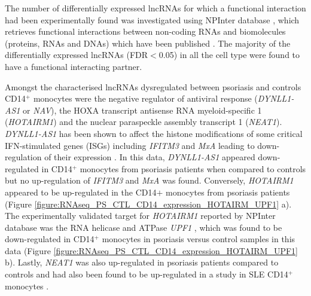 The number of differentially expressed lncRNAs for which a functional interaction had been experimentally found was investigated using NPInter database , which retrieves functional interactions between non-coding RNAs and biomolecules (proteins, RNAs and DNAs) which have been published \parencite{Hao2016}. The majority of the differentially expressed lncRNAs (FDR$<$0.05) in all the cell type were found to have a functional interacting partner.



Amongst the characterised lncRNAs dysregulated between psoriasis and controls CD14$^+$ monocytes were the negative regulator of antiviral response (\textit{DYNLL1-AS1} or \textit{NAV}), the HOXA transcript antisense RNA myeloid-specific 1 (\textit{HOTAIRM1}) and the nuclear paraspeckle assembly transcript 1 (\textit{NEAT1}). \textit{DYNLL1-AS1} has been shown to affect the histone modifications of some critical IFN-stimulated genes (ISGs) including \textit{IFITM3} and \textit{MxA} leading to down-regulation of their expression \parencite{Ouyang2014}. In this data, \textit{DYNLL1-AS1} appeared down-regulated in CD14$^+$ monocytes from psoriasis patients when compared to controls but no up-regulation of \textit{IFITM3} and \textit{MxA} was found. Conversely, \textit{HOTAIRM1} appeared to be up-regulated in the CD14$+$ monocytes from psoriasis patients (Figure \ref{figure:RNAseq_PS_CTL_CD14_expression_HOTAIRM_UPF1} a). The experimentally validated target for \textit{HOTAIRM1} reported by NPInter database was the RNA helicase and ATPase \textit{UPF1} \parencite{Hao2016}, which was found to be down-regulated in CD14$^+$ monocytes in psoriasis versus control samples in this data (Figure \ref{figure:RNAseq_PS_CTL_CD14_expression_HOTAIRM_UPF1} b). Lastly, \textit{NEAT1} was also up-regulated in psoriasis patients compared to controls and had also been found to be up-regulated in a study in SLE CD14$^+$ monocytes \parencite{Zhang2016}.

